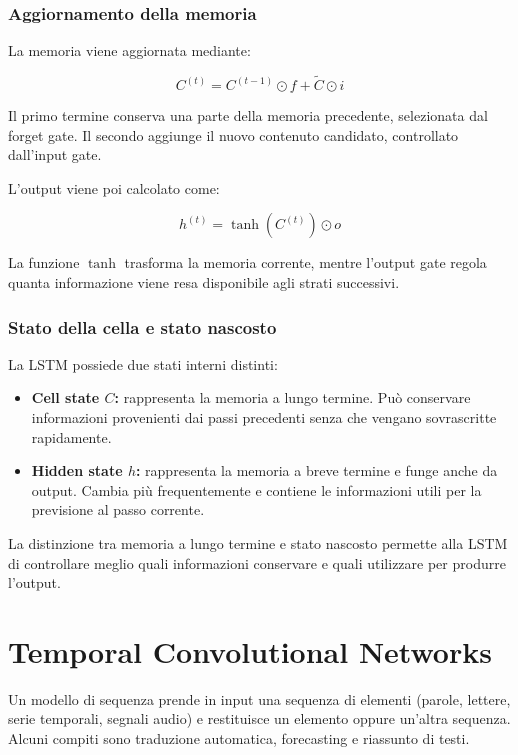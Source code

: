 \documentclass[11pt,a4paper]{article}
\begin{document}
\subsubsection{Aggiornamento della memoria}

La memoria viene aggiornata mediante:

\[
C^{(t)}
=
C^{(t-1)}\odot f
+
\widetilde{C}\odot i
\]

Il primo termine conserva una parte della memoria precedente, selezionata dal forget gate. Il secondo aggiunge il nuovo contenuto candidato, 
controllato dall'input gate.

L'output viene poi calcolato come:

\[
h^{(t)}
=
\tanh\left(C^{(t)}\right)\odot o
\]

La funzione $\tanh$ trasforma la memoria corrente, mentre l'output gate regola quanta informazione viene resa disponibile agli strati successivi.

\subsubsection{Stato della cella e stato nascosto}

La LSTM possiede due stati interni distinti:

\begin{itemize}
    \item \textbf{Cell state $C$:} rappresenta la memoria a lungo termine. Può conservare informazioni provenienti dai passi precedenti senza che 
    vengano sovrascritte rapidamente.

    \item \textbf{Hidden state $h$:} rappresenta la memoria a breve termine e funge anche da output. Cambia più frequentemente e contiene le
     informazioni utili per la previsione al passo corrente.
\end{itemize}

La distinzione tra memoria a lungo termine e stato nascosto permette alla LSTM di controllare meglio quali informazioni conservare e quali 
utilizzare per produrre l'output.




\section{Temporal Convolutional Networks}
Un modello di sequenza prende in input una sequenza di elementi (parole, lettere, serie temporali, segnali audio) e 
restituisce un elemento oppure un'altra sequenza. Alcuni compiti sono traduzione automatica,
forecasting e riassunto di testi. 
\end{document}
